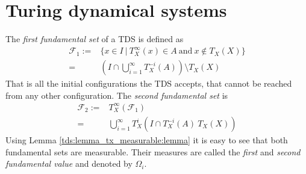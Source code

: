 \section{Turing dynamical systems} \label{tds}





The \emph{first fundamental set} of a TDS is defined as
\begin{align*}
	\mathcal{F}_1 :=&\{ x \in I~|~T_X^\infty(x) \in A~\text{and}~x \notin T_X(X) \} \\
	=&(I \cap \bigcup_{i=1}^\infty T_X^{-i}(A)) \setminus T_X(X)
\end{align*}
That is all the initial configurations the TDS accepts, that cannot be reached from any other configuration.
The \emph{second fundamental set} is
\begin{align*}
	\mathcal{F}_2 :=&T_X^\infty(\mathcal{F}_1) \\
	=&\bigcup_{i=1}^\infty T_X^i( I \cap T_X^{-i}(A) \ T_X(X))
\end{align*}
Using Lemma \ref{tds:lemma_tx_measurable:lemma} it is easy to see that both fundamental sets are measurable.
Their measures are called the \emph{first} and \emph{second fundamental value} and denoted by $\Omega_i$.

